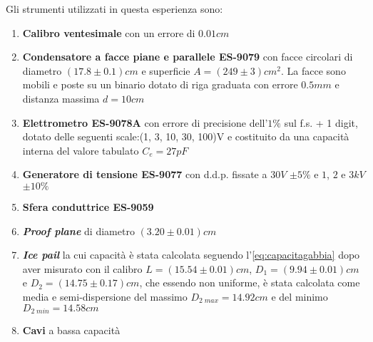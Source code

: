 {\fontsize{11}{14}\selectfont 
Gli strumenti utilizzati in questa esperienza sono:
\begin{enumerate}
    \item \textbf{Calibro ventesimale} con un errore di $0.01 cm$
    \item \textbf{Condensatore a facce piane e parallele ES-9079} con facce circolari di diametro $(17.8 \pm 0.1) cm$ e superficie $A = (249 \pm 3) cm^2$. La facce sono mobili e poste su un binario dotato di riga graduata con errore $0.5 mm$ e distanza massima $d = 10 cm$
    \item \textbf{Elettrometro ES-9078A} con errore di precisione dell'$1\%$ sul f.s. + 1 digit, dotato delle seguenti scale:(1, 3, 10, 30, 100)V e costituito da una capacità interna del valore tabulato $C_e = 27 pF$
    \item \textbf{Generatore di tensione ES-9077} con d.d.p. fissate a $30 V$ $\pm 5\%$ e $1$, $2$ e $3 kV$ $\pm 10\%$
    \item \textbf{Sfera conduttrice ES-9059}
    \item \textbf{\emph{Proof plane}} di diametro $(3.20 \pm 0.01) cm$
    \item \textbf{\emph{Ice pail}} la cui capacità è stata calcolata seguendo l'\autoref{eq:capacitagabbia} dopo aver misurato con il calibro $L = (15.54 \pm 0.01) cm$, $D_1 = (9.94 \pm 0.01) cm$ e $D_2 = (14.75 \pm 0.17) cm$, che essendo non uniforme, è stata calcolata come media e semi-dispersione del massimo $D_{2 \; max} = 14.92 cm$ e del minimo $D_{2 \; min} = 14.58 cm$
    \item \textbf{Cavi} a bassa capacità
\end{enumerate}

\par}